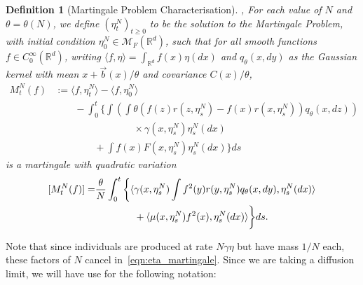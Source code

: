 \documentclass[12pt]{article}
\newtheorem{definition}[theorem]{Definition}
\newcommand{\IR}{\mathbb R}
\newcommand{\meanq}{\vec b}    %
\newcommand{\covq}{C}     %
\newcommand{\measures}{\mathcal{M}_F(\IR^d)} %
\begin{document}
\begin{definition}[Martingale Problem Characterisation]
    \label{defn:mgale_construction},
For each value of $N$ and $\theta = \theta(N)$,
we define $(\eta^N_t)_{t \geq 0}$ to be the solution to the Martingale Problem,
with initial condition $\eta^N_0 \in \measures$,
such that for all smooth functions $f \in C^{\infty}_{0}(\mathbb{R}^d)$,
writing $\langle f, \eta \rangle = \int_{\IR^d} f(x) \eta(dx)$
and $q_\theta(x, dy)$ as the Gaussian kernel
with mean $x + \meanq(x)/\theta$ and covariance $\covq(x) / \theta$,
\begin{equation}
    \label{eqn:eta_martingale}
\begin{aligned}
M^N_t(f)
&:=  \langle f, \eta^N_t \rangle
        -\langle f, \eta^N_0 \rangle
 \\ &\qquad {}
 -  \int_{0}^{t}\bigg\{
        \int\left( \int \theta
             \left(
                f(z)r(z, \eta^N_{s})
                - f(x)r(x, \eta^N_{s})
            \right)
        q_\theta(x,dz) \right)
\\ & \qquad \qquad \qquad \qquad {}
        \times \gamma(x, \eta^N_{s}) \eta^N_{s}(dx)
\\ & \qquad \qquad {}
    + \int f(x) F(x, \eta^N_{s}) \eta^N_{s}(dx)
    \bigg\} ds
\end{aligned}    
\end{equation}
is a martingale with quadratic variation
    \begin{equation} \label{eqn:prelimit_martingale_variation}
\begin{aligned} \relax
[ M^N_t(f)] =& 
\frac{\theta}{N} \int_{0}^{t}\bigg\{
    \langle \gamma(x, \eta^N_{s})
        \int f^2(y)r(y, \eta^N_{s}) q_\theta(x,dy) 
    , \eta^N_{s}(dx) \rangle \\
& \qquad \qquad {}
    + \langle \mu(x, \eta^N_{s}) f^2(x) 
    , \eta^N_{s}(dx)\rangle
    \bigg\}ds. 
\end{aligned}    
\end{equation}
\end{definition}

Note that
since individuals are produced at rate $N \gamma \eta$ but have mass $1/N$ each,
these factors of $N$ cancel in~\eqref{eqn:eta_martingale}.
Since we are taking a diffusion limit,
we will have use for the following notation:
\end{document}
